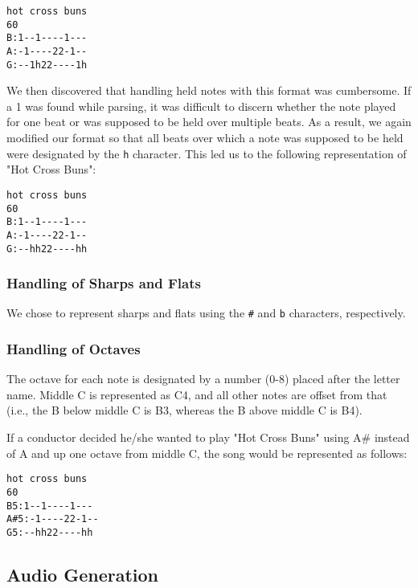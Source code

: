\documentclass[12pt, letterpaper]{article}
\begin{document}
\begin{verbatim}
hot cross buns
60
B:1--1----1---
A:-1----22-1--
G:--1h22----1h
\end{verbatim}

We then discovered that handling held notes with this format was cumbersome. If a 1 was found while parsing, it was difficult to discern whether the note played for one beat or was supposed to be held over multiple beats. As a result, we again modified our format so that all beats over which a note was supposed to be held were designated by the \texttt{h} character. This led us to the following representation of "Hot Cross Buns":

\begin{verbatim}
hot cross buns
60
B:1--1----1---
A:-1----22-1--
G:--hh22----hh
\end{verbatim}
            
\subsubsection{Handling of Sharps and Flats}
We chose to represent sharps and flats using the \texttt{\#} and \texttt{b} characters, respectively.

\subsubsection{Handling of Octaves}
The octave for each note is designated by a number (0-8) placed after the letter name. Middle C is represented as C4, and all other notes are offset from that (i.e., the B below middle C is B3, whereas the B above middle C is B4).

If a conductor decided he/she wanted to play "Hot Cross Buns" using A\# instead of A and up one octave from middle C, the song would be represented as follows:

\begin{verbatim}
hot cross buns
60
B5:1--1----1---
A#5:-1----22-1--
G5:--hh22----hh
\end{verbatim}

\subsection{Audio Generation}


\end{document}
